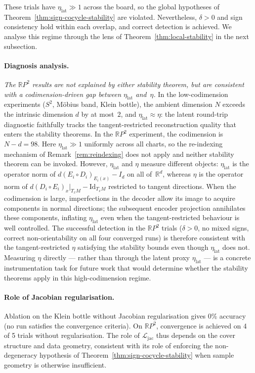 \documentclass[11pt]{article}
\newcommand{\R}{\mathbb{R}}
\newcommand{\Id}{\mathrm{Id}}
\theoremstyle{plain}
\theoremstyle{definition}
\theoremstyle{remark}
\begin{document}
These trials have $\eta_{\mathrm{lat}} \gg 1$ across the board, so the global hypotheses of Theorem~\ref{thm:sign-cocycle-stability} are violated. Nevertheless, $\delta > 0$ and sign consistency hold within each overlap, and correct detection is achieved. We analyse this regime through the lens of Theorem~\ref{thm:local-stability} in the next subsection.

\paragraph{Diagnosis analysis.} \emph{The $\mathbb{R}P^2$ results are not explained by 
either stability theorem, but are consistent with a 
codimension-driven gap between $\eta_{\mathrm{lat}}$ 
and~$\eta$.}  In the low-codimension experiments ($S^2$, 
M\"obius band, Klein bottle), the ambient dimension $N$ 
exceeds the intrinsic dimension $d$ by at most~$2$, and 
$\eta_{\mathrm{lat}} \approx \eta$: the latent round-trip 
diagnostic faithfully tracks the tangent-restricted 
reconstruction quality that enters the stability theorems.  
In the $\mathbb{R}P^2$ experiment, the codimension is 
$N - d = 98$.  Here $\eta_{\mathrm{lat}} \gg 1$ uniformly 
across all charts, so the re-indexing mechanism of 
Remark~\ref{rem:reindexing} does not apply and neither 
stability theorem can be invoked.  However, 
$\eta_{\mathrm{lat}}$ and $\eta$ measure different objects: 
$\eta_{\mathrm{lat}}$ is the operator norm of 
$d(E_i \circ D_i)_{E_i(x)} - I_d$ on all of~$\R^d$, whereas 
$\eta$ is the operator norm of 
$d(D_i \circ E_i)_x|_{T_xM} - \Id_{T_xM}$ restricted to 
tangent directions.  When the codimension is large, 
imperfections in the decoder allow its image to acquire 
components in normal directions; the subsequent encoder 
projection annihilates these components, inflating 
$\eta_{\mathrm{lat}}$ even when the tangent-restricted 
behaviour is well controlled.  The successful detection in 
the $\mathbb{R}P^2$ trials ($\delta > 0$, no mixed signs, 
correct non-orientability on all four converged runs) is 
therefore consistent with the tangent-restricted $\eta$ 
satisfying the stability bounds even though 
$\eta_{\mathrm{lat}}$ does not.  Measuring $\eta$ directly 
--- rather than through the latent proxy 
$\eta_{\mathrm{lat}}$ --- is a concrete instrumentation task 
for future work that would determine whether the stability 
theorems apply in this high-codimension regime.

\paragraph{Role of Jacobian regularisation.}
Ablation on the Klein bottle without Jacobian regularisation gives 0\% accuracy (no run satisfies the convergence criteria). On $\mathbb{R}P^2$, convergence is achieved on 4 of 5 trials without regularisation. The role of $\mathcal{L}_{\mathrm{jac}}$ thus depends on the cover structure and data geometry, consistent with its role of enforcing the non-degeneracy hypothesis of Theorem~\ref{thm:sign-cocycle-stability} when sample geometry is otherwise insufficient.
\end{document}
